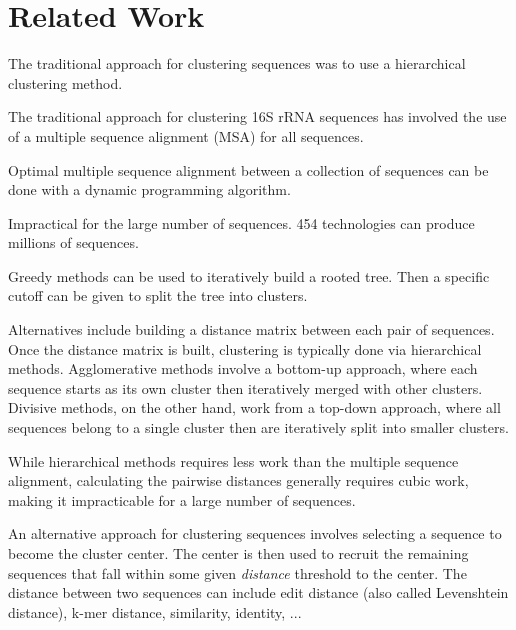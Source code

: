 \section{Related Work}

The traditional approach for clustering sequences was to use a hierarchical clustering method.


The traditional approach for clustering 16S rRNA sequences has involved the use of a multiple sequence alignment (MSA) for all sequences.

Optimal multiple sequence alignment between a collection of sequences can be done with a dynamic programming algorithm.

Impractical for the large number of sequences.
454 technologies can produce millions of sequences.

Greedy methods can be used to iteratively build a rooted tree.
Then a specific cutoff can be given to split the tree into clusters.

Alternatives include building a distance matrix between each pair of sequences.  
Once the distance matrix is built, clustering is typically done via hierarchical methods.
Agglomerative methods involve a bottom-up approach, where each sequence starts as its own cluster then iteratively merged with other clusters.
Divisive methods, on the other hand, work from a top-down approach, where all sequences belong to a single cluster then are iteratively split into smaller clusters.

While hierarchical methods requires less work than the multiple sequence alignment, calculating the pairwise distances generally requires cubic work, making it impracticable for a large number of sequences.

An alternative approach for clustering sequences involves selecting a sequence to become the cluster center.
The center is then used to recruit the remaining sequences that fall within some given \emph{distance} threshold to the center.
The distance between two sequences can include edit distance (also called Levenshtein distance), k-mer distance, similarity, identity, ...

